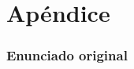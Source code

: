\documentclass[a4paper,11pt]{article}
\begin{document}
%
%
%
%
%
%
%
%
%
%
%
%
\part{Apéndice}
\appendix

\section{Enunciado original}\label{sec:enunciado}


\clearpage
\end{document}
